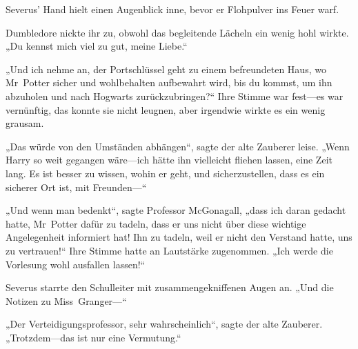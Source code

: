 Severus’ Hand hielt einen Augenblick inne, bevor er Flohpulver ins Feuer warf.

Dumbledore nickte ihr zu, obwohl das begleitende Lächeln ein wenig hohl wirkte.
„Du kennst mich viel zu gut, meine Liebe.“

„Und ich nehme an, der Portschlüssel geht zu einem befreundeten Haus, wo Mr~Potter sicher und wohlbehalten aufbewahrt wird, bis du kommst, um ihn abzuholen und nach Hogwarts zurückzubringen?“ Ihre Stimme war fest—es war vernünftig, das konnte sie nicht leugnen, aber irgendwie wirkte es ein wenig grausam.

„Das würde von den Umständen abhängen“, sagte der alte Zauberer leise.
„Wenn Harry so weit gegangen wäre—ich hätte ihn vielleicht fliehen lassen, eine Zeit lang. Es ist besser zu wissen, wohin er geht, und sicherzustellen, dass es ein sicherer Ort ist, mit Freunden—“

„Und wenn man bedenkt“, sagte Professor McGonagall, „dass ich daran gedacht hatte, Mr~Potter dafür zu tadeln, dass er uns nicht über diese wichtige Angelegenheit informiert hat! Ihn zu tadeln, weil er nicht den Verstand hatte, uns zu vertrauen!“ Ihre Stimme hatte an Lautstärke zugenommen.
„Ich werde die Vorlesung wohl ausfallen lassen!“

Severus starrte den Schulleiter mit zusammengekniffenen Augen an.
„Und die Notizen zu Miss~Granger—“

„Der Verteidigungsprofessor, sehr wahrscheinlich“, sagte der alte Zauberer.
„Trotzdem—das ist nur eine Vermutung.“

